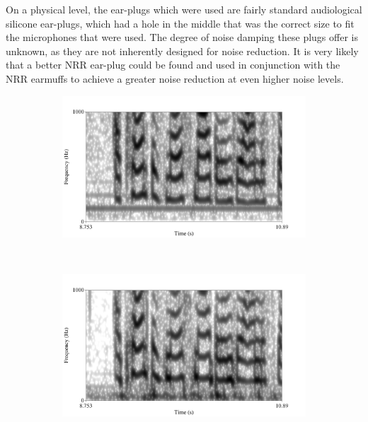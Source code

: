 On a physical level, the ear-plugs which were used are fairly standard audiological silicone ear-plugs, which had a hole in the middle that was the correct size to fit the microphones that were used.  The degree of noise damping these plugs offer is unknown, as they are not inherently designed for noise reduction.  It is very likely that a better NRR ear-plug could be found and used in conjunction with the \DIFdelbegin {}\DIFdelend \DIFaddbegin {}\DIFaddend NRR earmuffs to achieve a greater noise reduction at even higher noise levels.

\DIFaddbegin \begin{figure}[H]
\centering
\begin{subfigure}{\textwidth}
  \centering
  \includegraphics[width=0.8\linewidth]{figure/low_frequency_hum.png}
  \caption{}
  \label{fig:low_freq_hum-mouth}
\end{subfigure}%
\\[2ex]
\begin{subfigure}{\textwidth}
  \centering
  \includegraphics[width=0.8\linewidth]{figure/low_frequency_hum-ear.png}
  \caption{}
  \label{fig:low_freq_hum-ear}
\end{subfigure}
\caption{}
\label{fig:low_freq_hum}
\end{figure}

